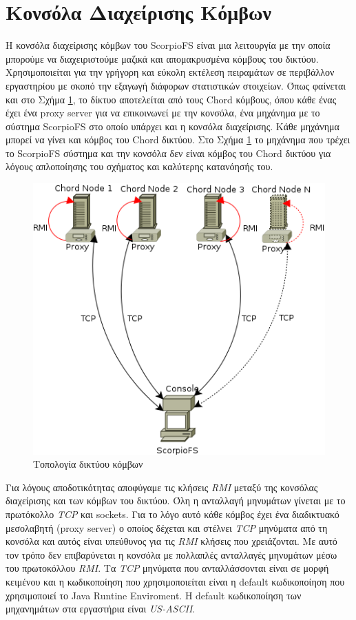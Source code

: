 \documentclass[a4paper]{article}
\begin{document}
\section{Κονσόλα Διαχείρισης Κόμβων}
Η κονσόλα διαχείρισης κόμβων του ScorpioFS είναι μια λειτουργία με την οποία
μπορούμε να διαχειριστούμε μαζικά και απομακρυσμένα κόμβους του δικτύου.
Χρησιμοποιείται για την γρήγορη και εύκολη εκτέλεση πειραμάτων σε περιβάλλον
εργαστηρίου με σκοπό την εξαγωγή διάφορων στατιστικών στοιχείων. Όπως
φαίνεται και στο Σχήμα \ref{fig:topology}, το δίκτυο αποτελείται από τους Chord
κόμβους, όπου κάθε ένας έχει ένα proxy server για να επικοινωνεί με την κονσόλα,
ένα μηχάνημα με το σύστημα ScorpioFS στο οποίο υπάρχει και η κονσόλα
διαχείρισης. Κάθε μηχάνημα μπορεί να γίνει και κόμβος του Chord δικτύου. Στο
Σχήμα \ref{fig:topology} το μηχάνημα που τρέχει το ScorpioFS σύστημα και την
κονσόλα δεν είναι κόμβος του Chord δικτύου για λόγους απλοποίησης του σχήματος
και καλύτερης κατανόησής του.

\begin{figure}[tbh]
\centering
\includegraphics[scale=0.75]{images/scorpio_console.png}
\caption{Τοπολογία δικτύου κόμβων}
\label{fig:topology}
\end{figure}

Για λόγους αποδοτικότητας αποφύγαμε τις κλήσεις \emph{RMI} μεταξύ της κονσόλας
διαχείρισης και των κόμβων του δικτύου. Όλη η ανταλλαγή μηνυμάτων γίνεται με το
πρωτόκολλο \emph{TCP} και sockets. Για το λόγο αυτό κάθε κόμβος έχει ένα
διαδικτυακό μεσολαβητή (proxy
server) ο οποίος δέχεται και στέλνει \emph{TCP} μηνύματα από τη κονσόλα και αυτός 
είναι υπεύθυνος για τις \emph{RMI} κλήσεις που χρειάζονται. Με αυτό τον τρόπο δεν
επιβαρύνεται η κονσόλα με πολλαπλές ανταλλαγές μηνυμάτων μέσω του πρωτοκόλλου
\emph{RMI}. Τα \emph{TCP} μηνύματα που ανταλλάσσονται είναι σε μορφή κειμένου και
η κωδικοποίηση που χρησιμοποιείται είναι η default κωδικοποίηση που χρησιμοποιεί το
Java Runtine Enviroment. Η default κωδικοποίηση των μηχανημάτων στα εργαστήρια
είναι \emph{US-ASCII}.
\end{document}
